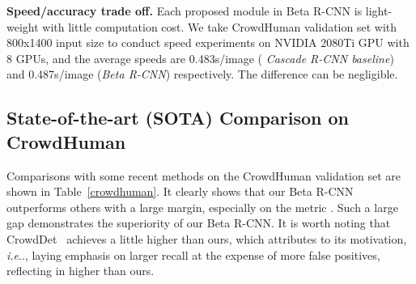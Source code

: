 \documentclass{article}
\makeatletter
\DeclareRobustCommand\onedot{\futurelet\@let@token\@onedot}
\def\@onedot{\ifx\@let@token.\else.\null\fi\xspace}
\def\ie{\emph{i.e}\onedot} \def\Ie{\emph{I.e}\onedot}
\makeatother
\begin{document}
\textbf{Speed/accuracy trade off.}
Each proposed module in Beta R-CNN is light-weight with little computation cost. We take CrowdHuman validation set with 800x1400 input size to conduct speed experiments on NVIDIA 2080Ti GPU with 8 GPUs, and the average speeds are 0.483s/image ( \emph{Cascade R-CNN baseline}) and 0.487s/image (\emph{Beta R-CNN}) respectively.
The difference can be negligible.

\subsection{State-of-the-art (SOTA) Comparison on CrowdHuman}
Comparisons with some recent methods on the CrowdHuman validation set are shown in Table~\ref{crowdhuman}.
It clearly shows that our Beta R-CNN outperforms others with a large margin, especially on the metric .
Such a large gap demonstrates the superiority of our Beta R-CNN.
It is worth noting that CrowdDet~\cite{EMD} achieves a little higher  than ours, which attributes to its motivation, \ie, laying emphasis on larger recall at the expense of more false positives, reflecting in higher  than ours.
\end{document}

